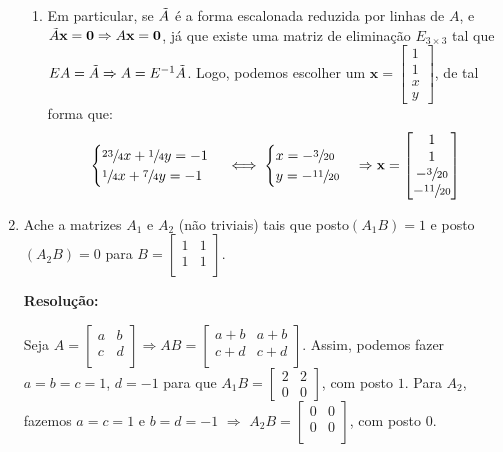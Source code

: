 \documentclass[leqno]{article}
\begin{document}
\begin{enumerate}
\begin{enumerate}
        \item Em particular, se $\Tilde{A}$ é a forma escalonada reduzida por linhas de $A$, e $\Tilde{A}\textbf{x}=\textbf{0}\Rightarrow A\textbf{x}=\textbf{0}$, já que existe uma matriz de eliminação $E_{3\times3}$ tal que $EA=\Tilde{A}\Rightarrow A = E^{-1}\tilde{A}$. Logo, podemos escolher um $\textbf{x}=\begin{bmatrix}
        1\\
        1\\
        x\\
        y
        \end{bmatrix}$, de tal forma que:
        $$\begin{cases}\sfrac{23}{4}x+\sfrac{1}{4}y=-1\\
        \sfrac{1}{4}x+\sfrac{7}{4}y=-1\end{cases}\iff \begin{cases}x=-\sfrac{3}{20}\\
        y=-\sfrac{11}{20}\end{cases}\Rightarrow \textbf{x}=\begin{bmatrix}
        1\\
        1\\
        -\sfrac{3}{20}\\
        -\sfrac{11}{20}
        \end{bmatrix}$$
    \end{enumerate}
    
    \item Ache a matrizes $A_1$ e $A_2$ (não triviais) tais que posto$(A_1B) = 1$ e posto$(A_2B) = 0$ para $B=\begin{bmatrix}
    1 & 1\\
    1 & 1\\
    \end{bmatrix}$.
    
    \textbf{Resolução:}
    
    Seja $A=\begin{bmatrix}
    a & b\\
    c & d\\
    \end{bmatrix}\Rightarrow AB = \begin{bmatrix}
    a+b & a+b\\
    c+d & c+d\\
    \end{bmatrix}$. Assim, podemos fazer $a = b=c=1$, $d=-1$ para que $A_1B=\begin{bmatrix}
    2 & 2\\
    0 & 0
    \end{bmatrix}$, com posto $1$. Para $A_2$, fazemos $a=c=1$ e $b=d=-1$ $\Rightarrow$ $A_2B=\begin{bmatrix}
    0 & 0\\
    0 & 0\\
    \end{bmatrix}$, com posto $0$.
    

\end{enumerate}
\end{document}
